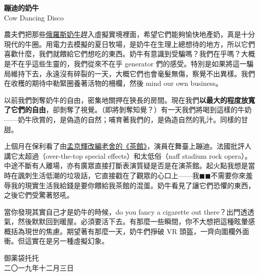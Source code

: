 \documentclass[10pt]{article}
\begin{document}
\begin{flushleft}
\textbf{蹦迪的奶牛}\\
Cow Dancing Disco\\
\end{flushleft}
\vspace{3em}

農夫們把那些\href{https://msh.mosreg.ru/sobytiya/novosti-ministerstva/25-11-2019-10-07-55-na-podmoskovnoy-ferme-testirovali-vr-ochki-dlya-ko}{俄羅斯奶牛}趕入虛擬實境裡面，希望它們能夠愉快地產奶，真是十分現代的牛圈。用電力去模擬的夏日牧場，是奶牛在生理上總想待的地方，所以它們喜歡什麼，我們就餵給它們想吃的東西。奶牛有意識到受騙嗎？我們在乎嗎？大概是不在乎這些生靈的，我們從來不在乎
generator
們的感受。特別是如果將這一騙局維持下去，永遠沒有碎裂的一天，大概它們也會毫髮無傷，察覺不出異樣。我們在收穫的期待中勒緊圈養著活物的柵欄，然後
mind our own business。

以前我們剝奪奶牛的自由，密集地關押在狹長的房間。現在我們\textbf{以最大的程度放寬了它們的自由}，卻剝奪了視覺。（即將剝奪知覺？）有一天我們將喝到這樣的牛奶{——}奶牛欣賞的，是偽造的自然；哺育著我們的，是偽造自然的乳汁。同樣的甘甜。

上個月在保利看了由\href{https://www.scmp.com/news/china/society/article/3018456/daring-new-take-classic-chinese-play-teahouse-causes-stir-france}{孟京輝改編老舍的《茶館》}，演員在舞臺上蹦迪。法國批評人講它太超過（over-the-top
special effects）和太低俗（naff stadium rock
opera）。中途不斷有人離場，亦有廣眾直接打斷表演質疑是否是在演茶館。起火點我想是當時在諷刺生活低潮的垃圾話，它直接戳在了觀眾的心口上{——}我$\blacksquare\blacksquare$不需要你來羞辱我的現實生活我給錢是要你餵給我茶館的混蛋。奶牛看見了讓它們恐懼的東西，之後它們受驚著怒吼。

當你發現其實自己才是奶牛的時候，do you fancy a cigarette out
there？出門透透氣，然後默默回到暖屋。必須要活下去。有那麼一些瞬間，你不大想把這種眩暈感概括為現世的焦慮。期望著有那麼一天，奶牛們掙破
VR 頭盔，一齊向圍欄外面衝。但這實在是另一種虛擬幻象。

\vspace{3em}
\begin{flushleft}
\small{御薬袋托托\\
二〇一九年十二月三日}
\end{flushleft}
\end{document}
